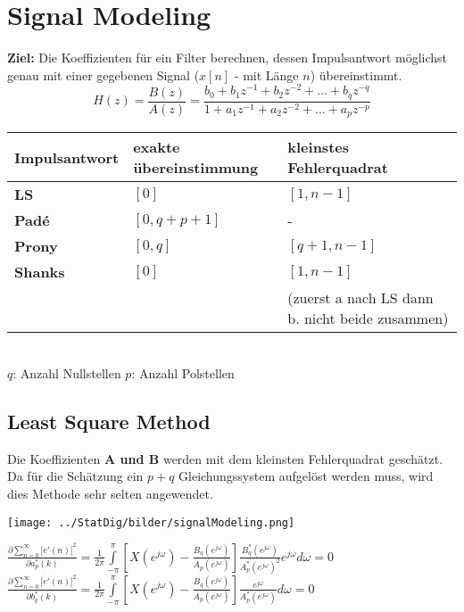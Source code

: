 \vspace{1em}
\begin{minipage}[t]{10cm}
  \vspace{-2cm}
  \section{Signal Modeling }
  \textbf{Ziel: } Die Koeffizienten für ein Filter berechnen, dessen
  Impulsantwort möglichst genau mit einer gegebenen Signal ($x[n]$ - mit
  Länge $n$) übereinstimmt.
      $$ H(z) = \dfrac{B(z)}{A(z)} = \dfrac{b_0 + b_1z^{-1} + b_2 z^{-2} + \dots +
      b_q z^{-q}}{1 + a_1z^{-1} + a_2 z^{-2} + \dots + a_p z^{-p}} $$ 

\end{minipage}
\hspace{0.25cm}
\begin{minipage}{9cm}
	\begin{tabular}{| p{1.4cm} | p{2cm} | p{3.9cm} | }
	    \hline
	    \textbf{Impuls\-antwort}
	    & exakte über\-ein\-stimmung
	    & kleinstes Fehler\-quadrat \\
	    \hline
	    \hline
	    \textbf{LS} 
	    & $[0]$
	    & $[1, n - 1]$\\
	    \hline
	    \textbf{Padé} 
	    & $[0, q + p + 1]$
	    & -\\
	    \hline
	    \textbf{Prony} 
	    & $[0, q]$
	    & $[q + 1, n-1]$ \\
	    \hline
	    \textbf{Shanks} 
	    & $[0]$
	    & $[1, n - 1]$\\
	    &&(zuerst a nach LS dann b. nicht beide zusammen)\\
	    \hline
	\end{tabular}\\
	$q$: Anzahl Nullstellen \hspace{1cm} $p$: Anzahl Polstellen
\end{minipage}

\subsection{Least Square Method }
Die Koeffizienten \textbf{A und B} werden mit dem kleinsten Fehlerquadrat geschätzt. Da für die Schätzung ein $p+q$ Gleichungssystem aufgelöst 
werden muss, wird dies Methode sehr selten angewendet.\\
\begin{minipage}{8cm}
	\texttt{[image: ../StatDig/bilder/signalModeling.png]}
\end{minipage}
\begin{minipage}{10cm}
$\frac{\partial \sum\limits_{n=0}^{\infty}|e'(n)|^2}{\partial a_p^*(k)}=\frac{1}{2\pi} \int\limits_{-\pi}^{\pi}\left[X(e^{j\omega})-
\frac{B_q(e^{j\omega})}{A_p (e^{j\omega})}\right]\frac{B^*_q(e^{j\omega})}{A_p^* (e^{j\omega})^2}e^{j\omega} d\omega=0$\\
$\frac{\partial \sum\limits_{n=0}^{\infty}|e'(n)|^2}{\partial b_q^*(k)}=\frac{1}{2\pi} \int\limits_{-\pi}^{\pi}\left[X(e^{j\omega})-
\frac{B_q(e^{j\omega})}{A_p (e^{j\omega})}\right]\frac{e^{j\omega}}{A_p^* (e^{j\omega})} d\omega=0$\\
\end{minipage} 
